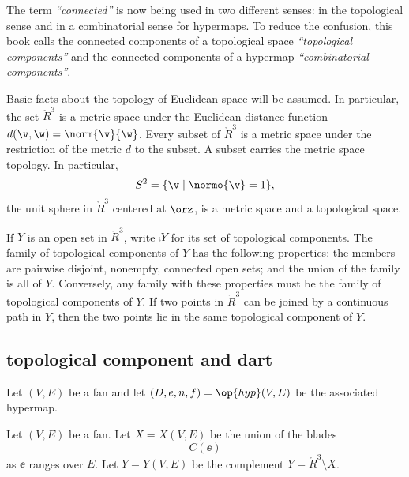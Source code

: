 \begin{remark} The term {\it ``connected''} is now being used in
two different senses: in the topological sense and in a combinatorial
sense for hypermaps.    To reduce the confusion, this book calls the connected components
of a topological space {\it ``topological components''} and the connected
components of a hypermap {\it ``combinatorial components''}.
\end{remark}
%
%
%


Basic facts about the topology of Euclidean space will be assumed.  In particular,
the set $\ring{R}^3$ is a metric space under the
Euclidean distance function $d(\v,\w) = \norm{\v}{\w}$.  Every subset of
$\ring{R}^3$ is a metric space under the restriction of the metric
$d$ to the subset.  A subset carries the metric space topology.
In particular, $$S^2 = \{ \v \mid \normo{ \v} = 1\},$$ the unit sphere in
$\ring{R}^3$ centered at $\orz$, is a metric space and a topological space.

If $Y$ is an open set in $\ring{R}^3$, write
$\comp{Y}$ for its set of topological components.
%
The family of topological components of $Y$ has the following properties:
the members are pairwise disjoint, nonempty, connected open sets; and the
union of the family is all of $Y$.
Conversely, any family with these properties must be the
family of topological components of $Y$.
If two
points in $\ring{R}^3$ 
can be joined by a continuous path in $Y$,
then the two points lie in the same topological component of $Y$.
%
%
%
 






\subsection{topological component and dart}

Let $(V,E)$ be a fan and let $(D,e,n,f) = \op{hyp}(V,E)$
be the associated hypermap.  
%
%
%

\begin{definition}[X,~Y]\label{def:XY}
Let $(V,E)$ be a fan.  Let $X=X(V,E)$ be the union of the
blades
   $$C(\ee)$$
as $\ee$ ranges over $E$.  Let $Y=Y(V,E)$ be the complement
$Y = \ring{R}^3\setminus X$.
%
%
\end{definition}


